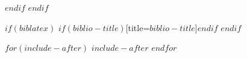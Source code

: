 \documentclass[doctor,twoside,chapterhead,otf]{znufethesis}
\begin{document}
$endif$
$endif$

$if(biblatex)$
\printbibliography$if(biblio-title)$[title=$biblio-title$]$endif$
$endif$

\ifodd\thepage
\blankpage
\fi

\appendix
\backmatter
\cleardoublepage
\pagestyle{appendixpage}
\renewcommand{\chapterlabel}{\appendixname} %




$for(include-after)$
$include-after$
$endfor$

\cleardoublepage
\renewcommand{\chapterlabel}{\ackname} %

\end{document}
